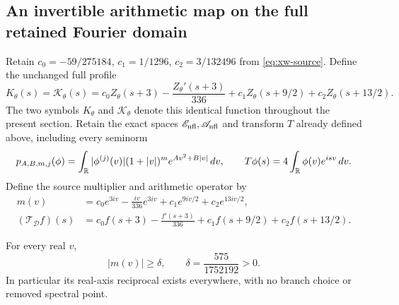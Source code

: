 \subsection{An invertible arithmetic map on the full retained Fourier domain}

Retain $c_0=-59/275184$, $c_1=1/1296$, $c_2=3/132496$
from \eqref{eq:xw-source}. Define the unchanged full profile
\begin{equation}\label{nfl:m:K}
 K_\theta(s)=\mathcal K_\theta(s)
 =c_0Z_\theta(s+3)-\frac{Z_\theta'(s+3)}{336}
       +c_1Z_\theta(s+9/2)+c_2Z_\theta(s+13/2).
\end{equation}
The two symbols $K_\theta$ and $\mathcal K_\theta$ denote this
identical function throughout the present section.
Retain the exact spaces \(\mathscr E_{\rm nfl},\mathscr A_{\rm nfl}\) and transform \(T\) already
defined above, including every seminorm
\[
p_{A,B,m,j}(\phi)=\int_\mathbb R|\phi^{(j)}(v)|(1+|v|)^m
                         e^{Av^2+B|v|}\,dv,
\qquad T\phi(s)=4\int_\mathbb R\phi(v)e^{isv}\,dv.
\]
Define the source multiplier and arithmetic operator by
\begin{align}
m(v)&=c_0e^{3iv}-\frac{iv}{336}e^{3iv}
               +c_1e^{9iv/2}+c_2e^{13iv/2},
\label{nfl:m:multiplier}\\
(\mathcal T_{\mathcal D}f)(s)
 &=c_0f(s+3)-\frac{f'(s+3)}{336}
                  +c_1f(s+9/2)+c_2f(s+13/2).
\label{nfl:m:T-D}
\end{align}

\begin{lemma}
\label{nfl:m:nonzero-multiplier}
For every real \(v\),
\begin{equation}
|m(v)|\geq\delta,\qquad \delta=\frac{575}{1752192}>0.
\label{nfl:m:delta}
\end{equation}
In particular its real-axis reciprocal exists everywhere, with no
branch choice or removed spectral point.
\end{lemma}

